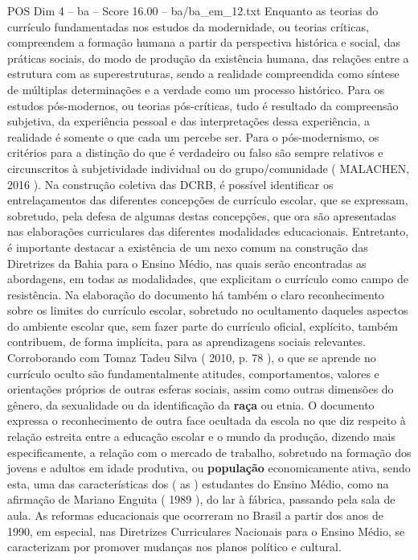 \begin{textsample}{POS Dim 4 – ba – Score 16.00 – ba/ba\_em\_12.txt}
Enquanto as teorias do currículo fundamentadas nos estudos da modernidade, ou teorias críticas, compreendem a formação humana a partir da perspectiva histórica e social, das práticas sociais, do modo de produção da existência humana, das relações entre a estrutura com as superestruturas, sendo a realidade compreendida como síntese de múltiplas determinações e a verdade como um processo histórico.
Para os estudos pós-modernos, ou teorias pós-críticas, tudo é resultado da compreensão subjetiva, da experiência pessoal e das interpretações dessa experiência, a realidade é somente o que cada um percebe ser.
Para o pós-modernismo, os critérios para a distinção do que é verdadeiro ou falso são sempre relativos e circunscritos à subjetividade individual ou do grupo/comunidade ( MALACHEN, 2016 ).
Na construção coletiva das DCRB, é possível identificar os entrelaçamentos das diferentes concepções de currículo escolar, que se expressam, sobretudo, pela defesa de algumas destas concepções, que ora são apresentadas nas elaborações curriculares das diferentes modalidades educacionais.
Entretanto, é importante destacar a existência de um nexo comum na construção das Diretrizes da Bahia para o Ensino Médio, nas quais serão encontradas as abordagens, em todas as modalidades, que explicitam o currículo como campo de resistência.
Na elaboração do documento há também o claro reconhecimento sobre os limites do currículo escolar, sobretudo no ocultamento daqueles aspectos do ambiente escolar que, sem fazer parte do currículo oficial, explícito, também contribuem, de forma implícita, para as aprendizagens sociais relevantes.
Corroborando com Tomaz Tadeu Silva ( 2010, p. 78 ), o que se aprende no currículo oculto são fundamentalmente atitudes, comportamentos, valores e orientações próprios de outras esferas sociais, assim como outras dimensões do gênero, da sexualidade ou da identificação da \textbf{raça} ou etnia.
O documento expressa o reconhecimento de outra face ocultada da escola no que diz respeito à relação estreita entre a educação escolar e o mundo da produção, dizendo mais especificamente, a relação com o mercado de trabalho, sobretudo na formação dos jovens e adultos em idade produtiva, ou \textbf{população} economicamente ativa, sendo esta, uma das características dos ( as ) estudantes do Ensino Médio, como na afirmação de Mariano Enguita ( 1989 ), do lar à fábrica, passando pela sala de aula.
As reformas educacionais que ocorreram no Brasil a partir dos anos de 1990, em especial, nas Diretrizes Curriculares Nacionais para o Ensino Médio, se caracterizam por promover mudanças nos planos político e cultural.

\end{textsample}
